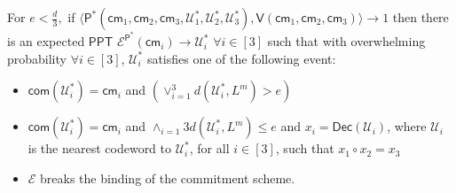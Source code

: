 \documentclass[runningheads]{llncs}
\newcommand{\innp}[2]{\langle #1,#2\rangle}
\def\ppt{\mathsf{PPT}}
\def\extrac{\mathcal{E}}
\def\prover{\mathsf{P}}
\def\verifier{\mathsf{V}}
\def\cm{\mathsf{cm}} %
\def\com{\mathsf{com}} %
\def\dec{\mathsf{Dec}}
\def\calU{\mathcal{U}}
\begin{document}
	\begin{theorem}
		For $ e < \frac{d}{3}, $ if $\innp{\prover^*(\cm_1, \cm_2, \cm_3 , \calU^*_1	, \calU^*_2, \calU^*_3)}{\verifier(\cm_1, \cm_2, \cm_3)} \rightarrow 1$ then there is an expected $\ppt$  $\extrac^{\prover^*}(\cm_i)\rightarrow \calU^*_i$ $\forall i\in [3]$ such that with overwhelming probability $\forall i \in [3]$, $\calU^*_i$ satisfies one of the following event: 
		\begin{itemize}
			\item $\com(\calU^*_i) = \cm_i$ and $(\vee_{i=1}^{3} d(\calU^*_i, L^m)> e)$ 
			\item $\com(\calU^*_i) = \cm_i$ and $\wedge_{i=1}{3} d(\calU^*_i,L^m)\leq e$ and $ x_i = \dec(\calU_i)$, where $\calU_i$ is the nearest codeword to $\calU^*_i$, for all $i\in [3]$, such that $x_1 \circ x_2 = x_3$
			\item $\extrac$ breaks the binding of the commitment scheme.
		\end{itemize} 
	
	\end{theorem}
\end{document}
